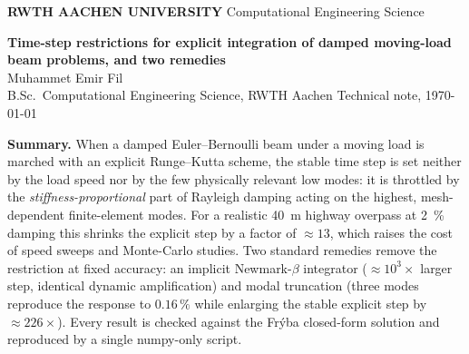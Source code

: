 \documentclass[11pt,a4paper]{article}
\newcommand{\rwthbanner}{%
  \noindent\colorbox{rwthblue}{%
    \parbox{\dimexpr\textwidth-2\fboxsep\relax}{%
      \vspace{2.5pt}%
      {\color{white}\textbf{RWTH AACHEN UNIVERSITY}}\hfill
      {\color{white}\footnotesize Computational Engineering Science}%
      \vspace{2.5pt}}}%
  \vspace{1pt}\par\noindent{\color{rule}\rule{\textwidth}{1.3pt}}%
}
\begin{document}
\rwthbanner
\vspace{0.8em}

{\raggedright
  {\LARGE\bfseries Time-step restrictions for explicit integration of damped
   moving-load beam problems, and two remedies}\\[0.8em]
  {\normalsize Muhammet Emir Fil}\\[0.15em]
  {\small B.Sc.\ Computational Engineering Science, RWTH Aachen
   \quad\textbullet\quad Technical note, \today}\par
}
\vspace{0.6em}
\noindent{\color{rule}\rule{\textwidth}{0.6pt}}
\vspace{1.0em}

\noindent\colorbox{rwthblue25}{%
  \parbox{\dimexpr\textwidth-2\fboxsep\relax}{%
  \vspace{3pt}\textbf{Summary.} When a damped Euler--Bernoulli beam under a
  moving load is marched with an explicit Runge--Kutta scheme, the stable time
  step is set neither by the load speed nor by the few physically relevant low
  modes: it is throttled by the \emph{stiffness-proportional} part of Rayleigh
  damping acting on the highest, mesh-dependent finite-element modes. For a
  realistic \SI{40}{m} highway overpass at \SI{2}{\percent} damping this shrinks
  the explicit step by a factor of \(\approx 13\), which raises the cost of speed
  sweeps and Monte-Carlo studies. Two standard remedies remove the
  restriction at fixed accuracy: an implicit Newmark-\(\beta\) integrator
  (\(\approx 10^3\times\) larger step, identical dynamic amplification) and
  modal truncation (three modes reproduce the response to \(0.16\,\%\) while
  enlarging the stable explicit step by \(\approx 226\times\)). Every result is
  checked against the Fr\'yba closed-form solution and reproduced by a single
  numpy-only script.\vspace{3pt}}}

\vspace{1.0em}

\end{document}
